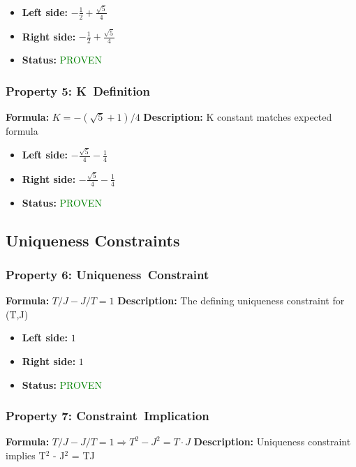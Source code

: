 \begin{itemize}
\item \textbf{Left side:} $- \frac{1}{2} + \frac{\sqrt{5}}{4}$
\item \textbf{Right side:} $- \frac{1}{2} + \frac{\sqrt{5}}{4}$
\item \textbf{Status:} \textcolor{green}{PROVEN}
\end{itemize}

\subsubsection*{Property 5: K~Definition}
\textbf{Formula:} $K = -(\sqrt{5}+1)/4$
\textbf{Description:} K constant matches expected formula

\begin{itemize}
\item \textbf{Left side:} $- \frac{\sqrt{5}}{4} - \frac{1}{4}$
\item \textbf{Right side:} $- \frac{\sqrt{5}}{4} - \frac{1}{4}$
\item \textbf{Status:} \textcolor{green}{PROVEN}
\end{itemize}


\subsection{Uniqueness Constraints}

\subsubsection*{Property 6: Uniqueness~Constraint}
\textbf{Formula:} $T/J - J/T = 1$
\textbf{Description:} The defining uniqueness constraint for (T,J)

\begin{itemize}
\item \textbf{Left side:} $1$
\item \textbf{Right side:} $1$
\item \textbf{Status:} \textcolor{green}{PROVEN}
\end{itemize}

\subsubsection*{Property 7: Constraint~Implication}
\textbf{Formula:} $T/J - J/T = 1  \Rightarrow  T^2 - J^2 = T \cdot J$
\textbf{Description:} Uniqueness constraint implies T$^2$ - J$^2$ = TJ

